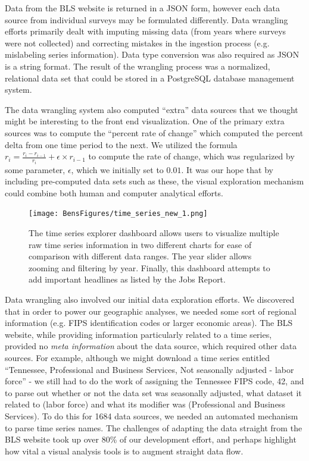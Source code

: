 \documentclass[journal]{IEEEtran}
\begin{document}
{Data from the BLS website is returned in a JSON form, however each data source from individual surveys may be formulated differently. Data wrangling efforts primarily dealt with imputing missing data (from years where surveys were not collected) and correcting mistakes in the ingestion process (e.g. mislabeling series information). Data type conversion was also required as JSON is a string format. The result of the wrangling process was a normalized, relational data set that could be stored in a PostgreSQL database management system.

The data wrangling system also computed ``extra'' data sources that we thought might be interesting to the front end visualization. One of the primary extra sources was to compute the ``percent rate of change'' which computed the percent delta from one time period to the next. We utilized the formula $r_i = \frac{r_i - r_{i-1}}{r_i} + \epsilon \times r_{i-1}$ to compute the rate of change, which was regularized by some parameter, $\epsilon$, which we initially set to $0.01$.  It was our hope that by including pre-computed data sets such as these, the visual exploration mechanism could combine both human and computer analytical efforts.

\begin{figure}[!ht]
    \centering
    \texttt{[image: BensFigures/time\_series\_new\_1.png]}
    \caption{The time series explorer dashboard allows users to visualize multiple raw time series information in two different charts for ease of comparison with different data ranges. The year slider allows zooming and filtering by year. Finally, this dashboard attempts to add important headlines as listed by the Jobs Report.}
    \label{fig:time_series}
\end{figure}


Data wrangling also involved our initial data exploration efforts. We discovered that in order to power our geographic analyses, we needed some sort of regional information (e.g. FIPS identification codes or larger economic areas). The BLS website, while providing information particularly related to a time series, provided no \textit{meta information} about the data source, which required other data sources. For example, although we might download a time series entitled ``Tennessee, Professional and Business Services, Not seasonally adjusted - labor force'' - we still had to do the work of assigning the Tennessee FIPS code, 42, and to parse out whether or not the data set was seasonally adjusted, what dataset it related to (labor force) and what its modifier was (Professional and Business Services). To do this for 1684 data sources, we needed an automated mechanism to parse time series names. The challenges of adapting the data straight from the BLS website took up over 80\% of our development effort, and perhaps highlight how vital a visual analysis tools is to augment straight data flow.}
\end{document}
